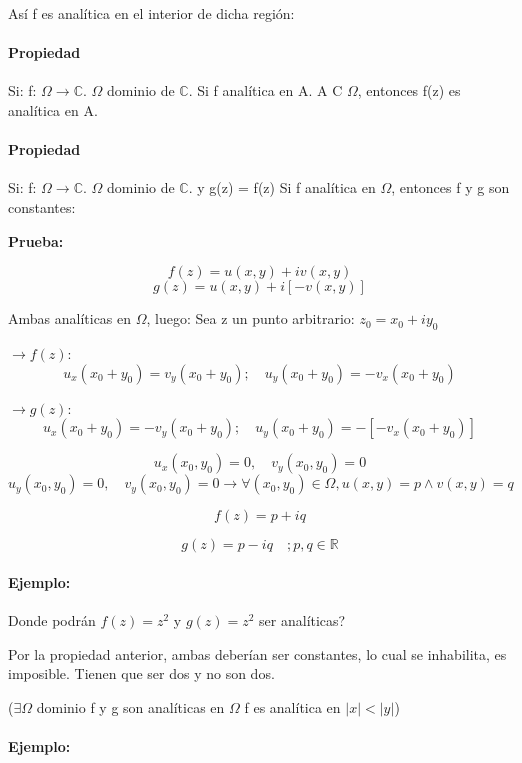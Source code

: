 \documentclass[a4paper,12pt]{article}
\begin{document}
Así f es analítica en el interior de dicha región:

\paragraph{Propiedad}

Si: f: $\Omega \rightarrow \mathbb{C}$. $\Omega$ dominio de $\mathbb{C}$.
Si f analítica en A. A C $\Omega$, entonces f(z) es analítica en A.

\paragraph{Propiedad}

Si: f: $\Omega \rightarrow \mathbb{C}$. $\Omega$ dominio de $\mathbb{C}$. y g(z) = f(z)
Si f analítica en $\Omega$, entonces f y g son constantes:

\textbf{Prueba:}

\[f(z) = u(x, y) + iv(x, y)\]
\[g(z) = u(x, y) + i[-v(x, y)]\]

Ambas analíticas en $\Omega$, luego:
Sea z un punto arbitrario:
$z_0 = x_0 + iy_0$

$\rightarrow f(z)$: \[u_x(x_0 + y_0) = v_y(x_0 + y_0); \quad u_y(x_0 + y_0) = -v_x(x_0 + y_0)\]

$\rightarrow g(z)$:
\[u_x(x_0 + y_0) = -v_y(x_0 + y_0); \quad u_y(x_0 + y_0) = -[- v_x(x_0 + y_0)]\]



\[u_x(x_0, y_0) = 0, \quad v_y(x_0, y_0) = 0\]
\[u_y(x_0, y_0) = 0, \quad v_y(x_0, y_0) = 0 \rightarrow \forall (x_0, y_0) \in \Omega, u(x, y) = p \wedge v(x, y) = q\]

\[f(z) = p + iq\]

\[g(z) = p - iq \quad ; p, q \in \mathbb{R}\]

\paragraph{Ejemplo:}

Donde podrán $f(z) = z^2$ y $g(z) = z^2$ ser analíticas?

Por la propiedad anterior, ambas deberían ser constantes, lo cual se inhabilita, es imposible. Tienen que ser dos y no son dos.

($\exists \Omega$ dominio f y g son analíticas en $\Omega$ f es analítica en $|x| < |y|$)

\paragraph{Ejemplo:}
\end{document}
